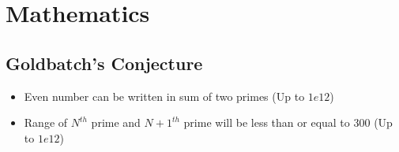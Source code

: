 \chapter{Mathematics}

\section{Goldbatch's Conjecture}

\begin{itemize}
	\item Even number can be written in sum of two primes (Up to $1e12$)
	\item Range of $N^{th}$ prime and $N+1^{th}$ prime will be less than or equal to $300$ (Up to $1e12$)
\end{itemize}